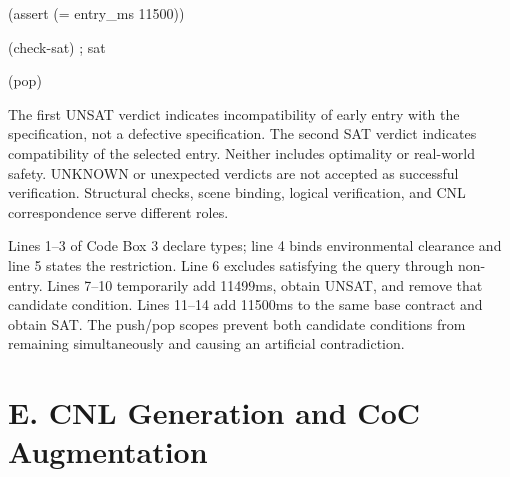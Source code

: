 \documentclass[11pt,a4paper]{article}
\begin{document}
\begin{minipage}{\linewidth}
{\begin{minipage}{\dimexpr\linewidth-2\fboxsep-2\fboxrule\relax}
\noindent{}\hspace{.8em}\parbox[t]{\dimexpr\linewidth-2.8em\relax}{\raggedright\ttfamily\fontsize{8.2}{10.5}\selectfont \hspace*{0.0em}(assert (= entry\_ms 11500))\strut}\par\vspace{1pt}
\noindent{}\hspace{.8em}\parbox[t]{\dimexpr\linewidth-2.8em\relax}{\raggedright\ttfamily\fontsize{8.2}{10.5}\selectfont \hspace*{0.0em}(check-sat) ; sat\strut}\par\vspace{1pt}
\noindent{}\hspace{.8em}\parbox[t]{\dimexpr\linewidth-2.8em\relax}{\raggedright\ttfamily\fontsize{8.2}{10.5}\selectfont \hspace*{0.0em}(pop)\strut}\par\vspace{1pt}
\end{minipage}}\par\medskip
\end{minipage}\par\medskip

The first UNSAT verdict indicates incompatibility of early entry with the specification, not a defective specification. The second SAT verdict indicates compatibility of the selected entry. Neither includes optimality or real-world safety. UNKNOWN or unexpected verdicts are not accepted as successful verification. Structural checks, scene binding, logical verification, and CNL correspondence serve different roles.\par

Lines 1–3 of Code Box 3 declare types; line 4 binds environmental clearance and line 5 states the restriction. Line 6 excludes satisfying the query through non-entry. Lines 7–10 temporarily add 11499ms, obtain UNSAT, and remove that candidate condition. Lines 11–14 add 11500ms to the same base contract and obtain SAT. The push/pop scopes prevent both candidate conditions from remaining simultaneously and causing an artificial contradiction.\par

\section*{E. CNL Generation and CoC Augmentation}
\end{document}
